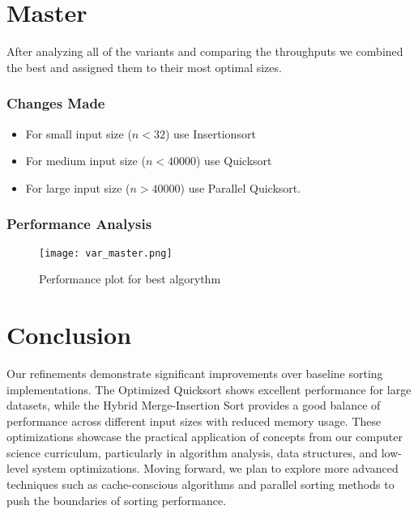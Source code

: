 \documentclass[twocolumn]{article}
\begin{document}
\section{Master}

After analyzing all of the variants and comparing the throughputs we combined the best and assigned them to their most optimal sizes.

\subsubsection{Changes Made}
\begin{itemize}
	\item For small input size ($n<32$) use Insertionsort
	\item For medium input size ($n<40000$) use Quicksort
	\item For large input size ($n > 40000$) use Parallel Quicksort.
\end{itemize}

\subsubsection{Performance Analysis}
\begin{figure}[H]
    \centering
    \texttt{[image: var\_master.png]}
    \caption{Performance plot for best algorythm}
    \label{fig:variantmaster_plot}
\end{figure}


\section{Conclusion}
Our refinements demonstrate significant improvements over baseline sorting implementations. The Optimized Quicksort shows excellent performance for large datasets, while the Hybrid Merge-Insertion Sort provides a good balance of performance across different input sizes with reduced memory usage. These optimizations showcase the practical application of concepts from our computer science curriculum, particularly in algorithm analysis, data structures, and low-level system optimizations. Moving forward, we plan to explore more advanced techniques such as cache-conscious algorithms and parallel sorting methods to push the boundaries of sorting performance.
\end{document}
